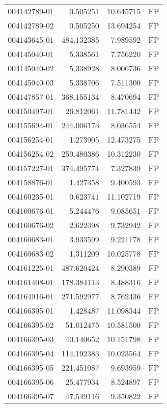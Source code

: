 \begin{tabular}{lrrl}
004142789-01 &    0.505251 &      10.645715 &   FP \\
004142789-02 &    0.505250 &      13.694254 &   FP \\
004143645-01 &  484.132385 &       7.989592 &   FP \\
004145040-01 &    5.338561 &       7.756220 &   FP \\
004145040-02 &    5.338928 &       8.006736 &   FP \\
004145040-03 &    5.338706 &       7.511300 &   FP \\
004147857-01 &  368.155134 &       8.470694 &   FP \\
004150497-01 &   26.812061 &      11.781442 &   FP \\
004155694-01 &  244.006173 &       8.036554 &   FP \\
004156254-01 &    1.273905 &      12.473275 &   FP \\
004156254-02 &  250.480386 &      10.312230 &   FP \\
004157227-01 &  374.495774 &       7.327839 &   FP \\
004158876-01 &    1.427358 &       9.400593 &   FP \\
004160235-01 &    0.623741 &      11.102719 &   FP \\
004160676-01 &    5.244476 &       9.085651 &   FP \\
004160676-02 &    2.622398 &       9.732942 &   FP \\
004160683-01 &    3.933599 &       9.221178 &   FP \\
004160683-02 &    1.311209 &      10.025778 &   FP \\
004161225-01 &  487.620424 &       8.290389 &   FP \\
004161408-01 &  178.384113 &       8.488316 &   FP \\
004164916-01 &  271.592977 &       8.762436 &   FP \\
004166395-01 &    1.428487 &      11.098344 &   FP \\
004166395-02 &   51.012475 &      10.581500 &   FP \\
004166395-03 &   40.140652 &      10.151798 &   FP \\
004166395-04 &  114.192383 &      10.023564 &   FP \\
004166395-05 &  221.451087 &       9.693959 &   FP \\
004166395-06 &   25.477934 &       8.524897 &   FP \\
004166395-07 &   47.549116 &       9.350822 &   FP \\

\end{tabular}
